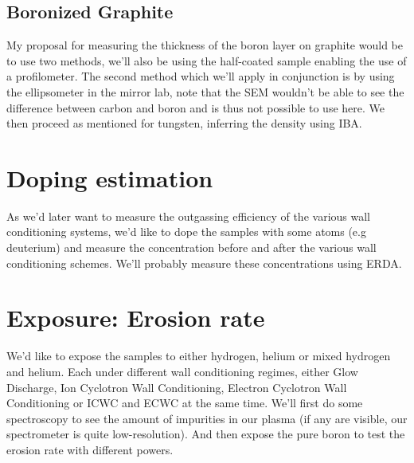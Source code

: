 \documentclass{article}
\begin{document}
\subsection{Boronized Graphite}
My proposal for measuring the thickness of the boron layer on graphite would be
to use two methods, we'll also be using the half-coated sample enabling the use
of a profilometer. The second method which we'll apply in conjunction is by
using the ellipsometer in the mirror lab, note that the SEM wouldn't be able to
see the difference between carbon and boron and is thus not possible to use
here. We then proceed as mentioned for tungsten, inferring the density using
IBA.
\section{Doping estimation}
As we'd later want to measure the outgassing efficiency of the various wall conditioning 
systems, we'd like to dope the samples with some atoms (e.g deuterium) and measure the concentration
before and after the various wall conditioning schemes.
We'll probably measure these concentrations using ERDA.
\section{Exposure: Erosion rate}
We'd like to expose the samples to either hydrogen, helium or mixed hydrogen
and helium. Each under different wall conditioning regimes, either Glow Discharge,
Ion Cyclotron Wall Conditioning, Electron Cyclotron Wall Conditioning or ICWC and ECWC
at the same time. We'll first do some spectroscopy to see the amount of impurities in
our plasma (if any are visible, our spectrometer is quite low-resolution). And then
expose the pure boron to test the erosion rate with different powers.
\end{document}
